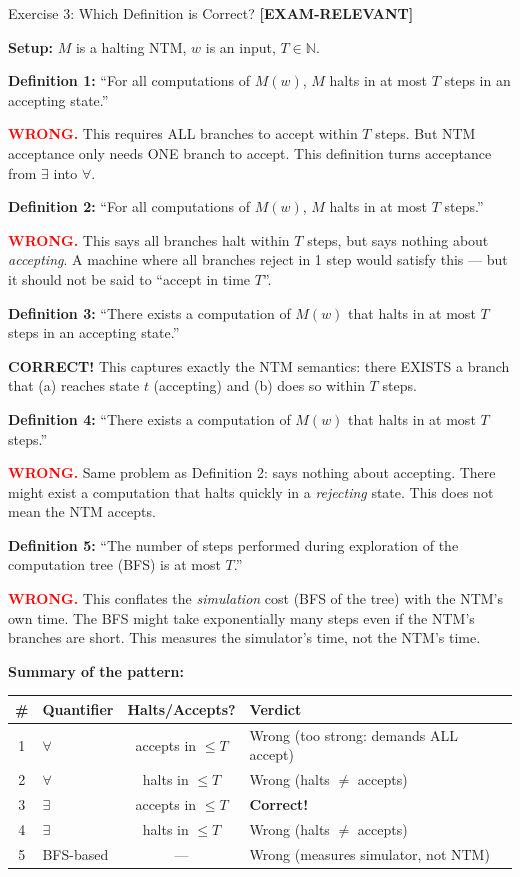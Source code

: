 \documentclass[11pt,a4paper]{article}
\newcommand{\kemark}{\textcolor{red!70!black}{\textbf{[EXAM-RELEVANT]}}}
\begin{document}
\begin{conceptbox}{Exercise 3: Which Definition is Correct? \kemark}

\textbf{Setup:} $M$ is a halting NTM, $w$ is an input, $T \in \mathbb{N}$.

\medskip
\textbf{Definition 1:} ``For all computations of $M(w)$, $M$ halts in at most $T$ steps in an accepting state.''

\textcolor{red}{\textbf{WRONG.}} This requires ALL branches to accept within $T$ steps. But NTM acceptance only needs ONE branch to accept. This definition turns acceptance from $\exists$ into $\forall$.

\medskip
\textbf{Definition 2:} ``For all computations of $M(w)$, $M$ halts in at most $T$ steps.''

\textcolor{red}{\textbf{WRONG.}} This says all branches halt within $T$ steps, but says nothing about \textit{accepting}. A machine where all branches reject in 1 step would satisfy this --- but it should not be said to ``accept in time $T$''.

\medskip
\textbf{Definition 3:} ``There exists a computation of $M(w)$ that halts in at most $T$ steps in an accepting state.''

\textcolor{green!60!black}{\textbf{CORRECT!}} This captures exactly the NTM semantics: there EXISTS a branch that (a) reaches state $t$ (accepting) and (b) does so within $T$ steps.

\medskip
\textbf{Definition 4:} ``There exists a computation of $M(w)$ that halts in at most $T$ steps.''

\textcolor{red}{\textbf{WRONG.}} Same problem as Definition 2: says nothing about accepting. There might exist a computation that halts quickly in a \textit{rejecting} state. This does not mean the NTM accepts.

\medskip
\textbf{Definition 5:} ``The number of steps performed during exploration of the computation tree (BFS) is at most $T$.''

\textcolor{red}{\textbf{WRONG.}} This conflates the \textit{simulation} cost (BFS of the tree) with the NTM's own time. The BFS might take exponentially many steps even if the NTM's branches are short. This measures the simulator's time, not the NTM's time.

\medskip
\textbf{Summary of the pattern:}

\begin{center}
\begin{tabular}{clcl}
\toprule
\# & Quantifier & Halts/Accepts? & Verdict \\
\midrule
1 & $\forall$ & accepts in $\leq T$ & Wrong (too strong: demands ALL accept) \\
2 & $\forall$ & halts in $\leq T$ & Wrong (halts $\neq$ accepts) \\
3 & $\exists$ & accepts in $\leq T$ & \textbf{Correct!} \\
4 & $\exists$ & halts in $\leq T$ & Wrong (halts $\neq$ accepts) \\
5 & BFS-based & --- & Wrong (measures simulator, not NTM) \\
\bottomrule
\end{tabular}
\end{center}


\end{conceptbox}
\end{document}
